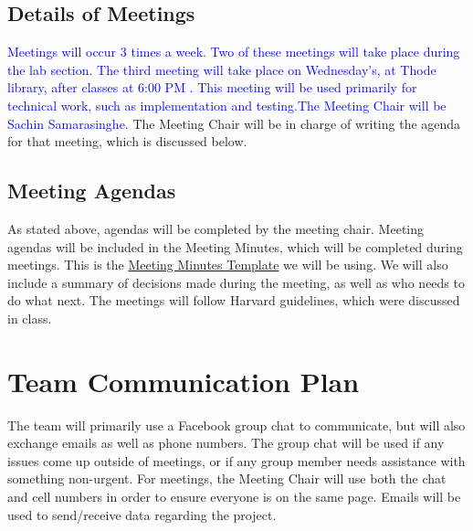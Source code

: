 \documentclass[12pt]{article}
\begin{document}
\subsection{Details of Meetings}
\textcolor{blue}{Meetings will occur 3 times a week. Two of these meetings will take place during the lab section. The third meeting will take place on Wednesday's, at Thode library, after classes at 6:00 PM . This meeting will be used primarily for technical work, such as implementation and testing.The Meeting Chair will be Sachin Samarasinghe}. The Meeting Chair will be in charge of writing the agenda for that meeting, which is discussed below. 

\subsection{Meeting Agendas}
As stated above, agendas will be completed by the meeting chair. Meeting agendas will be included in the Meeting Minutes, which will be completed during meetings. This is the \href{run:./docs/MeetingMinutesTemplates.pdf}{Meeting Minutes Template} we will be using. We will also include a summary of decisions made during the meeting, as well as who needs to do what next. The meetings will follow Harvard guidelines, which were discussed in class.

\section{Team Communication Plan}
The team will primarily use a Facebook group chat to communicate, but will also exchange emails as well as phone numbers.
The group chat will be used if any issues come up outside of meetings, or if any group member needs assistance with something non-urgent. For meetings, the Meeting Chair will use both the chat and cell numbers in order to ensure everyone is on the same page. Emails will be used to send/receive data regarding the project.

\newpage
\end{document}
